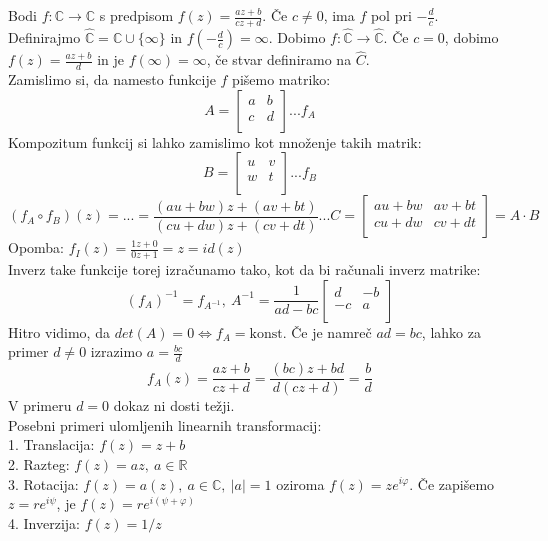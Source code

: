 \documentclass[a4paper]{article}
\newcommand{\C}{\mathbb{C}}
\newcommand{\R}{\mathbb{R}}
\newcommand{\fn}[3]{{#1}\colon {#2} \rightarrow {#3}}
\begin{document}
Bodi $\fn{f}{\C}{\C}$ s predpisom $\displaystyle{f(z) = \frac{az + b}{cz + d}}$. Če $c \neq 0$, ima $f$ pol pri $\displaystyle{-\frac{d}{c}}$.
Definirajmo $\hat{\C} = \C \cup \{\infty\}$ in $\displaystyle{f\left(-\frac{d}{c}\right)} = \infty$. Dobimo $\fn{f}{\hat{\C}}{\hat{\C}}$.
Če $c = 0$, dobimo $\displaystyle{f(z) = \frac{az + b}{d}}$ in je $f(\infty) = \infty$, če stvar definiramo na $\hat{C}$. \\[3mm]
Zamislimo si, da namesto funkcije $f$ pišemo matriko:
$$A = \begin{bmatrix}
    a & b \\
    c & d \\
\end{bmatrix} ... f_A$$
Kompozitum funkcij si lahko zamislimo kot množenje takih matrik:
$$B = \begin{bmatrix}
    u & v \\
    w & t \\
\end{bmatrix} ... f_B$$
$$(f_A \circ f_B)(z) = ... = \frac{(au + bw)z + (av + bt)}{(cu + dw)z + (cv + dt)} ... C = \begin{bmatrix}
    au + bw & av + bt \\
    cu + dw & cv + dt \\
\end{bmatrix} = A \cdot B$$
Opomba: $f_I(z) = \frac{1z + 0}{0z + 1} = z = id(z)$ \\[3mm]
Inverz take funkcije torej izračunamo tako, kot da bi računali inverz matrike:
$$(f_A)^{-1} = f_{A^{-1}},~A^{-1} = \frac{1}{ad-bc}\begin{bmatrix}
    d & -b \\
    -c & a \\
\end{bmatrix}$$
Hitro vidimo, da $det(A) = 0 \Leftrightarrow f_A = \text{konst.}$ Če je namreč $ad = bc$, lahko za primer $d \neq 0$ izrazimo $\displaystyle{a = \frac{bc}{d}}$
$$f_A(z) = \frac{az + b}{cz + d} = \frac{(bc)z + bd}{d(cz + d)} = \frac{b}{d}$$
V primeru $d=0$ dokaz ni dosti težji. \\[3mm]
Posebni primeri ulomljenih linearnih transformacij: \\
1. Translacija: $f(z) = z + b$ \\
2. Razteg: $f(z) = az, ~ a \in \R$ \\
3. Rotacija: $f(z) = a(z),~ a \in \C,~|a| = 1$ oziroma $f(z) = ze^{i\varphi}$. Če zapišemo $z = re^{i\psi}$, je $f(z) = re^{i(\psi + \varphi)}$ \\
4. Inverzija: $f(z) = 1/z$ \\
\end{document}
